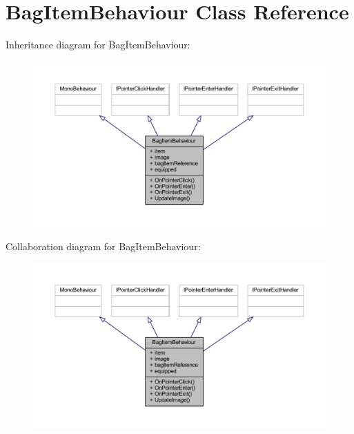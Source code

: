 \hypertarget{class_bag_item_behaviour}{}\section{Bag\+Item\+Behaviour Class Reference}
\label{class_bag_item_behaviour}


Inheritance diagram for Bag\+Item\+Behaviour\+:\nopagebreak
\begin{figure}[H]
\begin{center}
\leavevmode
\includegraphics[width=350pt]{class_bag_item_behaviour__inherit__graph}
\end{center}
\end{figure}


Collaboration diagram for Bag\+Item\+Behaviour\+:\nopagebreak
\begin{figure}[H]
\begin{center}
\leavevmode
\includegraphics[width=350pt]{class_bag_item_behaviour__coll__graph}
\end{center}
\end{figure}

